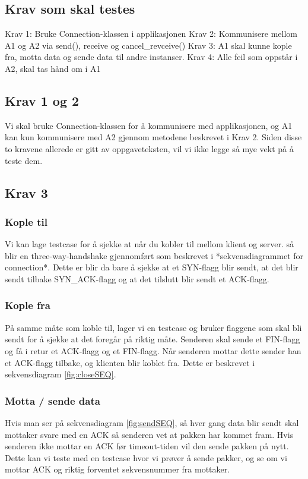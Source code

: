 \subsection{Krav som skal testes}
Krav 1: Bruke Connection-klassen i applikasjonen
Krav 2: Kommunisere mellom A1 og A2 via send(), receive og cancel\_revceive()
Krav 3: A1 skal kunne kople fra, motta data og sende data til andre instanser.
Krav 4: Alle feil som oppstår i A2, skal tas hånd om i A1

\subsection{Krav 1 og 2}
Vi skal bruke Connection-klassen for å kommunisere med applikasjonen, og A1 kan kun kommunisere med A2 gjennom metodene beskrevet i Krav 2. 
Siden disse to kravene allerede er gitt av oppgaveteksten, vil vi ikke legge så mye vekt på å teste dem.

\subsection{Krav 3}
\subsubsection{Kople til}
Vi kan lage testcase for å sjekke at når du kobler til mellom klient og server. så blir en three-way-handshake gjennomført som beskrevet i *sekvensdiagrammet for connection*. Dette er blir da bare å sjekke at et SYN-flagg blir sendt, at det blir sendt tilbake SYN\_ACK-flagg og at det tilslutt blir sendt et ACK-flagg.

\subsubsection{Kople fra}
På samme måte som koble til, lager vi en testcase og bruker flaggene som skal bli sendt for å sjekke at det foregår på riktig måte. Senderen skal sende et FIN-flagg og få i retur et ACK-flagg og et FIN-flagg. Når senderen mottar dette sender han et ACK-flagg tilbake, og klienten blir koblet fra. Dette er beskrevet i sekvensdiagram \ref{fig:closeSEQ}.

\subsubsection{Motta / sende data}
Hvis man ser på sekvensdiagram \ref{fig:sendSEQ}, så hver gang data blir sendt skal mottaker svare med en ACK så senderen vet at pakken har kommet fram. Hvis senderen ikke mottar en ACK før timeout-tiden vil den sende pakken på nytt. Dette kan vi teste med en testcase hvor vi prøver å sende pakker, og se om vi mottar ACK og riktig forventet sekvensnummer fra mottaker.

